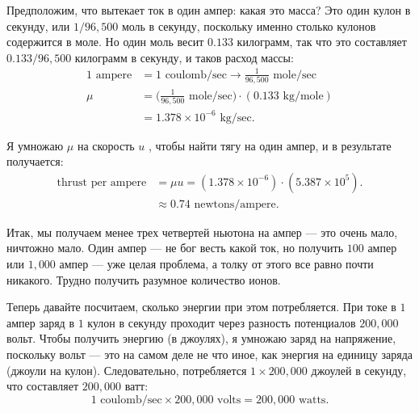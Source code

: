 \documentclass[11pt,oneside]{article}
\begin{document}
Предположим, что вытекает ток в один ампер: какая это масса? Это один кулон в секунду, или \(1/96,\!500\) моль в секунду, поскольку именно столько кулонов содержится в моле. Но один моль весит \(0.133\) килограмм, так что это составляет \(0.133/96,\!500\) килограмм в секунду, и таков расход массы: 
\begin{equation*} \begin{aligned} 1\text{ ampere} &= 1\text{ coulomb/sec} \rightarrow \frac{1}{96,\!500}\text{ mole/sec}\\[1ex] \mu &= \bigg(\frac{1}{96,\!500}\text{ mole/sec}\bigg)\cdot(0.133\text{ kg/mole})\\[1.25ex] &= 1.378 \times 10^{-6}\text{ kg/sec}. \end{aligned} \tag{3.24}
\label{Eq:TIPS:3:24} \end{equation*}
\par

Я умножаю \(\mu\) на скорость \(u\) , чтобы найти тягу на один ампер, и в результате получается: 
\begin{equation*} \begin{aligned} \text{thrust per ampere} &= \mu u = (1.378 \times 10^{-6})\cdot(5.387 \times 10^5).\\[1ex] &\approx 0.74\text{ newtons/ampere}. \end{aligned} \tag{3.25}
\label{Eq:TIPS:3:25} \end{equation*}
\par

Итак, мы получаем менее трех четвертей ньютона на ампер --- это очень мало, ничтожно мало. Один ампер --- не бог весть какой ток, но получить \(100\) ампер или \(1,\!000\) ампер --- уже целая проблема, а толку от этого все равно почти никакого. Трудно получить разумное количество ионов.\par

Теперь давайте посчитаем, сколько энергии при этом потребляется. При токе в \(1\) ампер заряд в \(1\) кулон в секунду проходит через разность потенциалов \(200,\!000\) вольт. Чтобы получить энергию (в джоулях), я умножаю заряд на напряжение, поскольку вольт --- это на самом деле не что иное, как энергия на единицу заряда (джоули на кулон). Следовательно, потребляется \(1\times200,\!000\) джоулей в секунду, что составляет \(200,\!000\) ватт: 
\begin{equation*} \tag{3.26}
\label{Eq:TIPS:3:26} 1\text{ coulomb/sec}\times200,\!000\text{ volts} = 200,\!000\text{ watts}. \end{equation*}
\par
\end{document}
